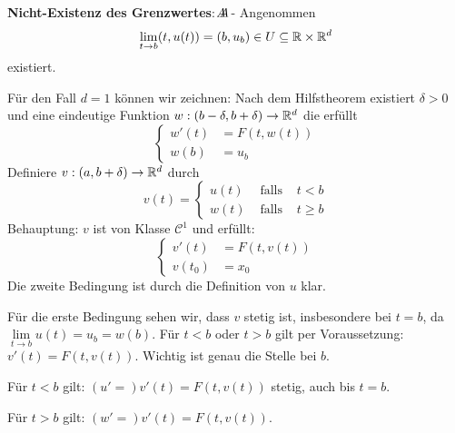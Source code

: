 \documentclass[main.tex]{subfiles}
\begin{document}
\begin{Beweis}
  \textbf{Nicht-Existenz des Grenzwertes}: $A\hspace{-1em}A$ - Angenommen
  $$\lim \limits_{t \to b} (t,u(t)) = (b,u_b) \in U \subseteq \mathbb{R} \times \mathbb{R}^d$$
  existiert.

  Für den Fall $d = 1$ können wir zeichnen:
  Nach dem Hilfstheorem existiert $\delta > 0$ und eine eindeutige Funktion $w: (b - \delta, b+\delta) \to \mathbb{R}^d$ die erfüllt
  $$\left\{\begin{aligned}
    w'(t) & = F(t, w(t)) \\
    w(b) & = u_b
  \end{aligned}\right.$$
  Definiere $v: (a,b + \delta) \to \mathbb{R}^d$ durch
  $$v(t) = \left\{\begin{aligned}
    u(t) & \text{ falls } & t < b \\
    w(t) & \text{ falls } & t \geq b
  \end{aligned}\right.$$
  Behauptung: $v$ ist von Klasse $\mathcal{C}^1$ und erfüllt:
  $$\left\{\begin{aligned}
    v'(t) & = F(t,v(t)) \\
    v(t_0) & = x_0
  \end{aligned}\right.$$
  Die zweite Bedingung ist durch die Definition von $u$ klar.

  Für die erste Bedingung sehen wir, dass $v$ stetig ist, insbesondere bei $t = b$, da $\lim \limits_{t \to b} u(t) = u_b = w(b)$. Für $t < b$ oder $t > b$ gilt per Voraussetzung: $v'(t) = F(t,v(t))$. Wichtig ist genau die Stelle bei $b$.

  Für $t < b$ gilt: $(u' = ) v'(t) = F(t,v(t))$ stetig, auch bis $t = b$.

  Für $t > b$ gilt: $(w' = ) v'(t) = F(t, v(t))$.


\end{Beweis}
\end{document}
